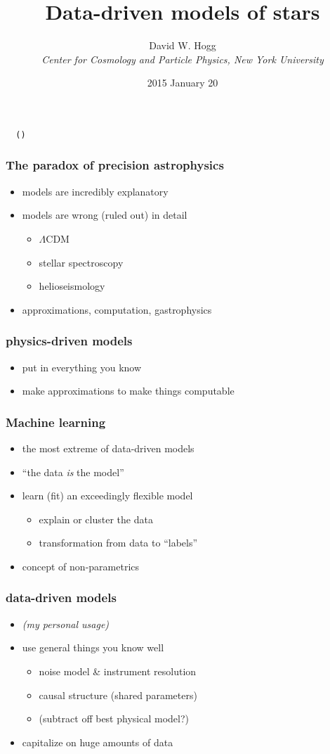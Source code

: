 \documentclass[pdftex]{beamer}
\title{Data-driven models of stars}
\author[David W. Hogg (NYU)]{David W. Hogg \\
  \textsl{\small Center for Cosmology and Particle Physics,
                 New York University}}
\date{2015 January 20}
\begin{document}
\begin{frame}
  \titlepage
  \texttt{\giturl~\githash~(\gitdate)}
\end{frame}

\begin{frame}
  \frametitle{The paradox of precision astrophysics}
  \begin{itemize}
  \item models are incredibly explanatory
  \item models are wrong (ruled out) in detail
    \begin{itemize}
    \item $\Lambda$CDM
    \item stellar spectroscopy
    \item helioseismology
    \end{itemize}
  \item approximations, computation, gastrophysics
  \end{itemize}
\end{frame}

\begin{frame}
  \frametitle{physics-driven models}
  \begin{itemize}
  \item put in everything you know
  \item make approximations to make things computable
  \end{itemize}
\end{frame}

\begin{frame}
  \frametitle{Machine learning}
  \begin{itemize}
  \item the most extreme of data-driven models
  \item ``the data \emph{is} the model''
  \item learn (fit) an exceedingly flexible model
    \begin{itemize}
    \item explain or cluster the data
    \item transformation from data to ``labels''
    \end{itemize}
  \item concept of non-parametrics
  \end{itemize}
\end{frame}

\begin{frame}
  \frametitle{data-driven models}
  \begin{itemize}
  \item \emph{(my personal usage)}
  \item use general things you know well
    \begin{itemize}
    \item noise model \& instrument resolution
    \item causal structure (shared parameters)
    \item (subtract off best physical model?)
    \end{itemize}
  \item capitalize on huge amounts of data
  \end{itemize}
\end{frame}
\end{document}
